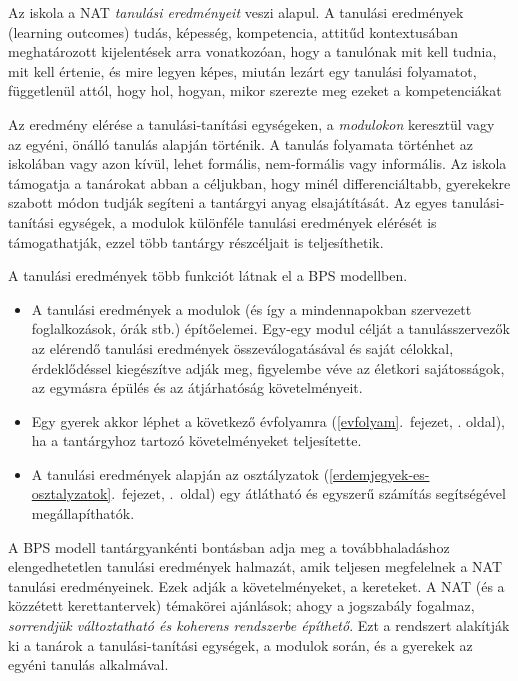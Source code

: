 Az iskola a NAT \emph{tanulási eredményeit} veszi alapul. A tanulási
eredmények (learning outcomes) tudás, képesség, kompetencia, attitűd
kontextusában meghatározott kijelentések arra vonatkozóan, hogy a
tanulónak mit kell tudnia, mit kell értenie, és mire legyen képes,
miután lezárt egy tanulási folyamatot, függetlenül attól, hogy hol,
hogyan, mikor szerezte meg ezeket a kompetenciákat
{\autocite{Cedefop2008}}

Az eredmény elérése a tanulási-tanítási egységeken, a \emph{modulokon}
keresztül vagy az egyéni, önálló tanulás alapján történik. A tanulás
folyamata történhet az iskolában vagy azon kívül, lehet formális,
nem-formális vagy informális. Az iskola támogatja a tanárokat abban a
céljukban, hogy minél differenciáltabb, gyerekekre szabott módon
tudják segíteni a tantárgyi anyag elsajátítását. Az egyes
tanulási-tanítási egységek, a modulok különféle tanulási eredmények
elérését is támogathatják, ezzel több tantárgy részcéljait is
teljesíthetik.

A tanulási eredmények több funkciót látnak el a BPS modellben.

\begin{itemize}
\tightlist
\item
  A tanulási eredmények a modulok (és így a mindennapokban szervezett
  foglalkozások, órák stb.) építőelemei. Egy-egy modul célját a
  tanulásszervezők az elérendő tanulási eredmények összeválogatásával és
  saját célokkal, érdeklődéssel kiegészítve adják meg, figyelembe véve
  az életkori sajátosságok, az egymásra épülés és az átjárhatóság
  követelményeit.
\item
  Egy gyerek akkor
  léphet a következő évfolyamra
  (\ref{evfolyam}.~fejezet, \pageref{evfolyam}. oldal),
  ha a tantárgyhoz tartozó követelményeket teljesítette.
\item
  A tanulási eredmények alapján
  az osztályzatok (\ref{erdemjegyek-es-osztalyzatok}.~fejezet, \pageref{erdemjegyek-es-osztalyzatok}.~oldal)
  egy átlátható és egyszerű számítás segítségével megállapíthatók.
\end{itemize}

A BPS modell tantárgyankénti bontásban adja meg a továbbhaladáshoz
elengedhetetlen tanulási eredmények halmazát, amik teljesen megfelelnek
a NAT tanulási eredményeinek. Ezek adják a követelményeket, a kereteket.
A NAT (és a közzétett kerettantervek) témakörei ajánlások; ahogy a
jogszabály fogalmaz, \emph{sorrendjük változtatható és koherens
rendszerbe építhető}. Ezt a rendszert alakítják ki a tanárok a
tanulási-tanítási egységek, a modulok során, és a gyerekek az egyéni
tanulás alkalmával.

